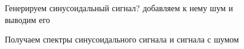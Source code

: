 \documentclass[12pt,a4paper]{scrartcl}
\begin{document}
\begin{figure}[h!]
\caption{Генерируем синусоидальный сигнал? добавляем к нему шум и выводим его}
\end{figure}

\begin{figure}[h!]
\caption{Получаем спектры синусоидального сигнала и сигнала с шумом}
\end{figure}
\end{document}
